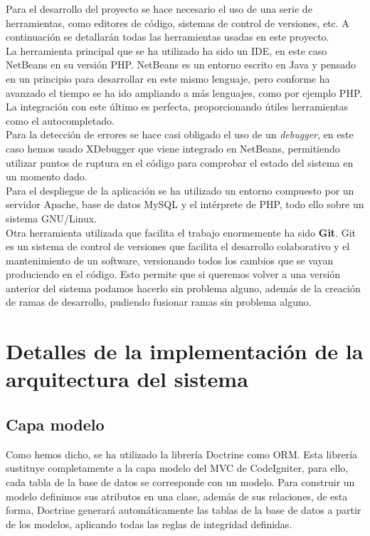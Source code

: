 Para el desarrollo del proyecto se hace necesario el uso de una serie de herramientas, como editores de código, sistemas de control de versiones, etc. A continuación se detallarán todas las herramientas usadas en este proyecto.\\

La herramienta principal que se ha utilizado ha sido un IDE, en este caso NetBeans en su versión PHP. NetBeans es un entorno escrito en Java y pensado en un principio para desarrollar en este mismo lenguaje, pero conforme ha avanzado el tiempo se ha ido ampliando a más lenguajes, como por ejemplo PHP. La integración con este último es perfecta, proporcionando útiles herramientas como el autocompletado.\\

Para la detección de errores se hace casi obligado el uso de un {\em debugger}, en este caso hemos usado XDebugger que viene integrado en NetBeans, permitiendo utilizar puntos de ruptura en el código para comprobar el estado del sistema en un momento dado.\\

Para el despliegue de la aplicación se ha utilizado un entorno compuesto por un servidor Apache, base de datos MySQL y el intérprete de PHP, todo ello sobre un sistema GNU/Linux.\\

Otra herramienta utilizada que facilita el trabajo enormemente ha sido {\bf Git}. Git es un sistema de control de versiones que facilita el desarrollo colaborativo y el mantenimiento de un software, versionando todos los cambios que se vayan produciendo en el código. Esto permite que si queremos volver a una versión anterior del sistema podamos hacerlo sin problema alguno, además de la creación de ramas de desarrollo, pudiendo fusionar ramas sin problema alguno.\\

\section{Detalles de la implementación de la arquitectura del sistema}

\subsection{Capa modelo}

Como hemos dicho, se ha utilizado la librería Doctrine como ORM. Esta librería sustituye completamente a la capa modelo del MVC de CodeIgniter, para ello, cada tabla de la base de datos se corresponde con un modelo. Para construir un modelo definimos sus atributos en una clase, además de sus relaciones, de esta forma, Doctrine generará automáticamente las tablas de la base de datos a partir de los modelos, aplicando todas las reglas de integridad definidas.\\

